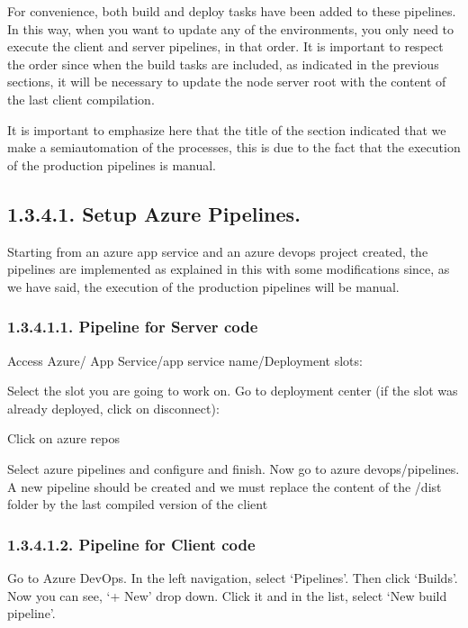 \documentclass[letterpaper,10pt,english]{sphinxmanual}
\begin{document}
For convenience, both build and deploy tasks have been added to these pipelines. In this way, when you want to update any of the environments, you only need to execute the client and server pipelines, in that order. It is important to respect the order since when the build tasks are included, as indicated in the previous sections, it will be necessary to update the node server root with the content of the last client compilation.

It is important to emphasize here that the title of the section indicated that we make a semiautomation of the processes, this is due to the fact that the execution of the production pipelines is manual.


\subsection{1.3.4.1. Setup Azure Pipelines.}
\label{\detokenize{pages/Environments/Build_deploy:setup-azure-pipelines}}
Starting from an azure app service and an azure devops project created, the pipelines are implemented as explained in this  with some modifications since, as we have said, the execution of the production pipelines will be manual.


\subsubsection{1.3.4.1.1. Pipeline for Server code}
\label{\detokenize{pages/Environments/Build_deploy:pipeline-for-server-code}}
Access Azure/ App Service/app service name/Deployment slots:



Select the slot you are going to work on. Go to deployment center (if the slot was already deployed, click on disconnect):



Click on azure repos



Select azure pipelines and configure and finish.
Now go to azure devops/pipelines. A new pipeline should be created and we must replace the content of the /dist folder by the last compiled version of the client






\subsubsection{1.3.4.1.2. Pipeline for Client code}
\label{\detokenize{pages/Environments/Build_deploy:pipeline-for-client-code}}
Go to Azure DevOps. In the left navigation, select ‘Pipelines’. Then click ‘Builds’. Now you can see, ‘+ New’ drop down. Click it and in the list, select ‘New build pipeline’.
\end{document}
